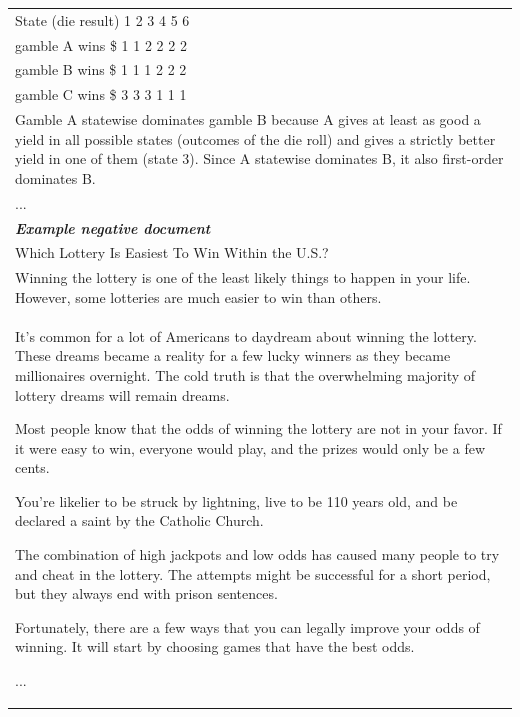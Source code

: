 \begin{table}[ht]
\begin{tabular}{p{13cm}}
State (die result)
1
2
3
4
5
6 \\
gamble A wins 
\$
1
1
2
2
2
2 \\
gamble B wins 
\$
1
1
1
2
2
2 \\
gamble C wins 
\$
3
3
3
1
1
1 \\
Gamble A statewise dominates gamble B because A gives at least as good a yield in all possible states (outcomes of the die roll) and gives a strictly better yield in one of them (state 3). Since A statewise dominates B, it also first-order dominates B. \\
... \\
\midrule
\textit{\textbf{Example negative document}} \\
\midrule
Which Lottery Is Easiest To Win Within the U.S.? \\
Winning the lottery is one of the least likely things to happen in your life. However, some lotteries are much easier to win than others. \\
It’s common for a lot of Americans to daydream about winning the lottery. These dreams became a reality for a few lucky winners as they became millionaires overnight. The cold truth is that the overwhelming majority of lottery dreams will remain dreams.

Most people know that the odds of winning the lottery are not in your favor. If it were easy to win, everyone would play, and the prizes would only be a few cents. 

You’re likelier to be struck by lightning, live to be 110 years old, and be declared a saint by the Catholic Church. 

The combination of high jackpots and low odds has caused many people to try and cheat in the lottery. The attempts might be successful for a short period, but they always end with prison sentences. 

Fortunately, there are a few ways that you can legally improve your odds of winning. It will start by choosing games that have the best odds. 

... \\
\bottomrule
\end{tabular}
\label{tab:economic_example}
\end{table}